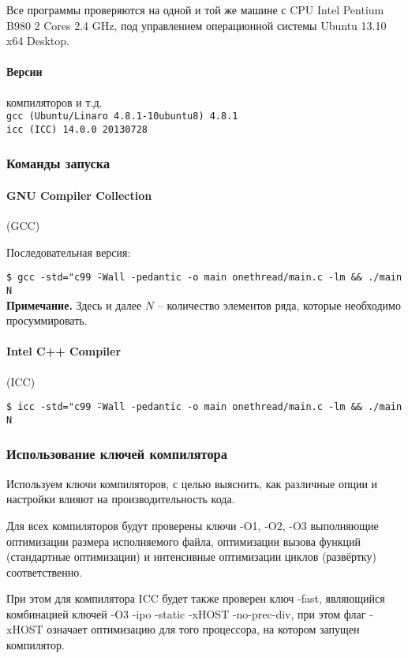 \documentclass[a4paper,12pt]{article}
\begin{document}
Все программы проверяются на одной и той же машине с CPU Intel Pentium B980 2 Cores 2.4 GHz, под управлением операционной системы Ubuntu 13.10 x64 Desktop.

\paragraph{Версии}компиляторов и т.д.\\
\texttt{gcc (Ubuntu/Linaro 4.8.1-10ubuntu8) 4.8.1}\\
\texttt{icc (ICC) 14.0.0 20130728}

\subsubsection{Команды запуска}
\paragraph{GNU Compiler Collection} (GCC)

Последовательная версия:

\texttt{\$ gcc -std="c99\"\ -Wall -pedantic -o\ main onethread/main.c\ -lm\ \&\& ./main N}\\

\noindent\textbf{Примечание.} Здесь и далее $N$ -- количество элементов ряда, которые необходимо просуммировать.

\paragraph{Intel C++ Compiler} (ICC)

\texttt{\$ icc -std="c99\"\ -Wall -pedantic -o\ main onethread/main.c\ -lm\ \&\& ./main N}\\

\subsubsection{Использование ключей компилятора}
Используем ключи компиляторов, с целью выяснить, как различные опции и настройки влияют на производительность кода.

Для всех компиляторов будут проверены ключи -O1, -O2, -O3 выполняющие оптимизации размера исполняемого файла, оптимизации вызова функций (стандартные оптимизации) и интенсивные оптимизации циклов (развёртку) соответственно.

При этом для компилятора ICC будет также проверен ключ -fast, являющийся комбинацией ключей -O3 -ipo -static -xHOST -no-prec-div, при этом флаг -xHOST означает оптимизацию для того процессора, на котором запущен компилятор.
\end{document}
